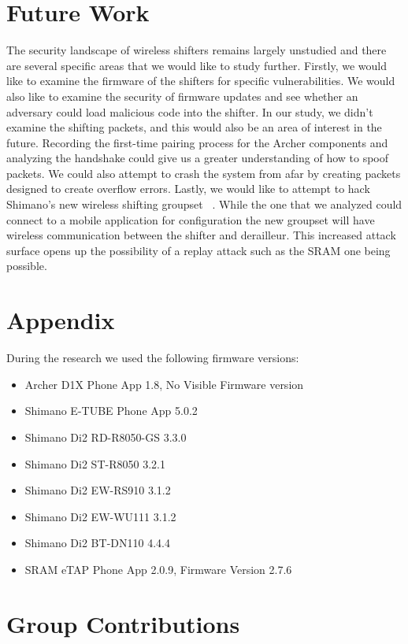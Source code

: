 \documentclass[letterpaper,twocolumn,10pt]{article}
\begin{document}
\section{Future Work}

The security landscape of wireless shifters remains largely unstudied and there are several specific areas that we would like to study further. Firstly, we would like to examine the firmware of the shifters for specific vulnerabilities. We would also like to examine the security of firmware updates and see whether an adversary could load malicious code into the shifter. In our study, we didn’t examine the shifting packets, and this would also be an area of interest in the future. Recording the first-time pairing process for the Archer components and analyzing the handshake could give us a greater understanding of how to spoof packets. We could also attempt to crash the system from afar by creating packets designed to create overflow errors. Lastly, we would like to attempt to hack Shimano’s new wireless shifting groupset~ \cite{newshimano}. While the one that we analyzed could connect to a mobile application for configuration the new groupset will have wireless communication between the shifter and derailleur. This increased attack surface opens up the possibility of a replay attack such as the SRAM one being possible.

  {\normalsize 
    }


\section{Appendix}
During the research we used the following firmware versions:
\begin{itemize}
  \item Archer D1X Phone App 1.8, No Visible Firmware version
  \item Shimano E-TUBE Phone App 5.0.2
  \item Shimano Di2 RD-R8050-GS 3.3.0
  \item Shimano Di2 ST-R8050 3.2.1
  \item Shimano Di2 EW-RS910 3.1.2
  \item Shimano Di2 EW-WU111 3.1.2
  \item Shimano Di2 BT-DN110 4.4.4
  \item SRAM eTAP Phone App 2.0.9, Firmware Version 2.7.6
\end{itemize}
\section{Group Contributions}
\end{document}
